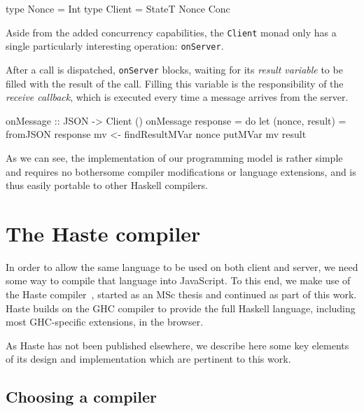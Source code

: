 \documentclass[preprint]{sigplanconf}
\begin{document}
\begin{code}
type Nonce = Int
type Client = StateT Nonce Conc
\end{code}

Aside from the added concurrency capabilities, the \lstinline!Client! monad
only has a single particularly interesting operation: \lstinline!onServer!.


After a call is dispatched, \lstinline!onServer! blocks, waiting for its
\emph{result variable} to be filled with the result of the call. Filling this
variable is the responsibility of the \emph{receive callback}, which is
executed every time a message arrives from the server.

\begin{code}
onMessage :: JSON -> Client ()
onMessage response = do
  let (nonce, result) = fromJSON response
  mv <- findResultMVar nonce
  putMVar mv result
\end{code}

As we can see, the implementation of our programming model is rather simple
and requires no bothersome compiler modifications or language extensions,
and is thus easily portable to other Haskell compilers.

\section{The Haste compiler}\label{sec:haste}

In order to allow the same language to be used on both client and server, we
need some way to compile that language into JavaScript. To this end, we make
use of the Haste compiler\ \cite{haste}, started as an MSc thesis and continued
as part of this work. Haste builds on the GHC compiler to provide the full
Haskell language, including most GHC-specific extensions, in the browser.

As Haste has not been published elsewhere, we describe here some key elements
of its design and implementation which are pertinent to this work.

\subsection{Choosing a compiler}
\end{document}
